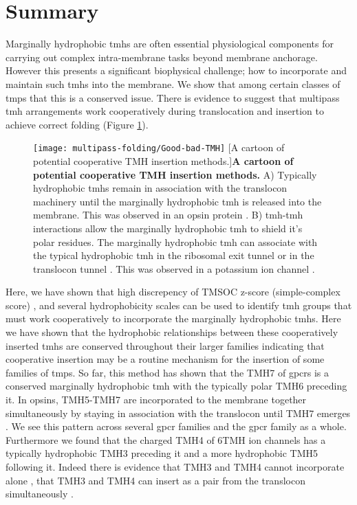 \section{Summary}

Marginally hydrophobic \gls{tmh}s are often essential physiological components for carrying out complex intra-membrane tasks beyond membrane anchorage.
However this presents a significant biophysical challenge; how to incorporate and maintain such \gls{tmh}s into the membrane.
We show that among certain classes of \gls{tmp}s that this is a conserved issue.
There is evidence to suggest that multipass \gls{tmh} arrangements work cooperatively during translocation and insertion to achieve correct folding \cite{Ismail2008, Virkki2014, Sadlish2005, Cross2009, Cymer2013, Sato2002, Sato2003, Zhang2007, Cymer2015, Tu2000} (Figure \ref{fig:Good-bad-TMH}).

\begin{figure}[!ht]
\centering
\texttt{[image: multipass-folding/Good-bad-TMH]}
		[A cartoon of potential cooperative TMH insertion methods.]{\textbf{A cartoon of potential cooperative TMH insertion methods.}
    A) Typically hydrophobic \gls{tmh}s remain in association with the translocon machinery until the marginally hydrophobic \gls{tmh} is released into the membrane.
    This was observed in an opsin protein \cite{Ismail2008}.
    B) \gls{tmh}\--\gls{tmh} interactions allow the marginally hydrophobic \gls{tmh} to shield it's polar residues.
    The marginally hydrophobic \gls{tmh} can associate with the typical hydrophobic \gls{tmh} in the ribosomal exit tunnel \cite{Tu2014} or in the translocon tunnel \cite{Zhang2007}.
    This was observed in a potassium ion channel \cite{Tu2014, Zhang2007, Cymer2015}.
    }

\label{fig:Good-bad-TMH}
\end{figure}

Here, we have shown that high discrepency of TMSOC z-score (simple-complex score) \cite{Wong2011, Wong2012}, and several hydrophobicity scales \cite{Hessa2005, Kyte1982, White1999, Eisenberg1984} can be used to identify \gls{tmh} groups that must work cooperatively to incorporate the marginally hydrophobic \gls{tmh}s.
Here we have shown that the hydrophobic relationships between these cooperatively inserted \gls{tmh}s are conserved throughout their larger families indicating that cooperative insertion may be a routine mechanism for the insertion of some families of \gls{tmp}s.
So far, this method has shown that the TMH7 of \gls{gpcr}s is a conserved marginally hydrophobic \gls{tmh} with the typically polar TMH6 preceding it.
In opsins, TMH5-TMH7 are incorporated to the membrane together simultaneously by staying in association with the translocon until TMH7 emerges \cite{Ismail2008}.
We see this pattern across several \gls{gpcr} families and the \gls{gpcr} family as a whole.
Furthermore we found that the charged TMH4 of 6TMH ion channels has a typically hydrophobic TMH3 preceding it and a more hydrophobic TMH5 following it.
Indeed there is evidence that TMH3 and TMH4 cannot incorporate alone \cite{Sato2003}, that TMH3 and TMH4 can insert as a pair from the translocon simultaneously \cite{Zhang2007, Cymer2015}.

